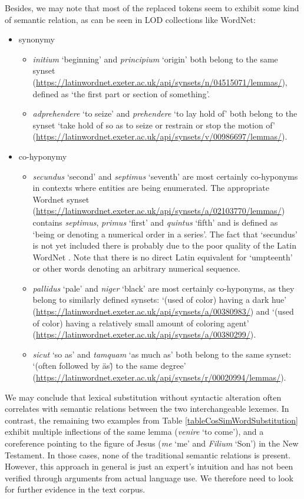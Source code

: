 \documentclass[oneside]{book}
\begin{document}
Besides, we may note that most of the replaced tokens seem to exhibit some kind of semantic relation, as can be seen in \gls{LOD} collections like WordNet:
\begin{itemize}
	\item synonymy
	\begin{itemize}
		\item \textit{initium} `beginning' and \textit{principium} `origin' both belong to the same synset (\url{https://latinwordnet.exeter.ac.uk/api/synsets/n/04515071/lemmas/}), defined as `the first part or section of something'.
		\item \textit{adprehendere} `to seize' and \textit{prehendere} `to lay hold of' both belong to the synset `take hold of so as to seize or restrain or stop the motion of' (\url{https://latinwordnet.exeter.ac.uk/api/synsets/v/00986697/lemmas/}).
	\end{itemize}
	\item co-hyponymy
	\begin{itemize}
		\item \textit{secundus} `second' and \textit{septimus} `seventh' are most certainly co-hyponyms in contexts where entities are being enumerated. The appropriate Wordnet synset (\url{https://latinwordnet.exeter.ac.uk/api/synsets/a/02103770/lemmas/}) contains \textit{septimus}, \textit{primus} `first' and \textit{quintus} `fifth' and is defined as `being or denoting a numerical order in a series'. The fact that `secundus' is not yet included there is probably due to the poor quality of the Latin WordNet \parencite[4]{franziniNuncEstAestimandum2019}. Note that there is no direct Latin equivalent for `umpteenth' or other words denoting an arbitrary numerical sequence.
		\item \textit{pallidus} `pale' and \textit{niger} `black' are most certainly co-hyponyms, as they belong to similarly defined synsets: `(used of color) having a dark hue' (\url{https://latinwordnet.exeter.ac.uk/api/synsets/a/00380983/}) and `(used of color) having a relatively small amount of coloring agent' (\url{https://latinwordnet.exeter.ac.uk/api/synsets/a/00380299/}).
		\item \textit{sicut} `so as' and \textit{tamquam} `as much as' both belong to the same synset: `(often followed by \"as\") to the same degree' (\url{https://latinwordnet.exeter.ac.uk/api/synsets/r/00020994/lemmas/}).
	\end{itemize}
\end{itemize}
We may conclude that lexical substitution without syntactic alteration often correlates with semantic relations between the two interchangeable lexemes. In contrast, the remaining two examples from Table \ref{tableCosSimWordSubstitution} exhibit multiple inflections of the same lemma (\textit{venire} `to come'), and a coreference pointing to the figure of Jesus (\textit{me} `me' and \textit{Filium} `Son') in the New Testament. In those cases, none of the traditional semantic relations is present. However, this approach in general is just an expert's intuition and has not been verified through arguments from actual language use. We therefore need to look for further evidence in the text corpus.
\end{document}

